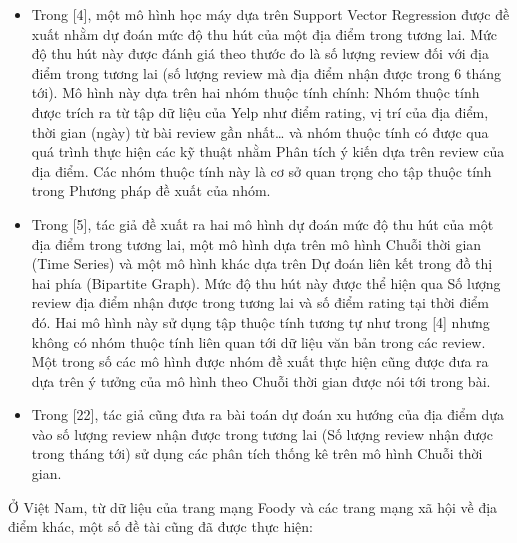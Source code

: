 \documentclass[12pt]{extarticle}
\begin{document}
\begin{itemize}
				\item Trong [4], một mô hình học máy dựa trên Support Vector Regression được đề xuất nhằm dự đoán mức độ thu hút của một địa điểm trong tương lai. Mức độ thu hút này được đánh giá theo thước đo là số lượng review đối với địa điểm trong tương lai (số lượng review mà địa điểm nhận được trong 6 tháng tới). Mô hình này dựa trên hai nhóm thuộc tính chính: Nhóm thuộc tính được trích ra từ tập dữ liệu của Yelp như điểm rating, vị trí của địa điểm, thời gian (ngày) từ bài review gần nhất… và nhóm thuộc tính có được qua quá trình thực hiện các kỹ thuật nhằm Phân tích ý kiến dựa trên review của địa điểm. Các nhóm thuộc tính này là cơ sở quan trọng cho tập thuộc tính trong Phương pháp đề xuất của nhóm.
				\item Trong [5], tác giả đề xuất ra hai mô hình dự đoán mức độ thu hút của một địa điểm trong tương lai, một mô hình dựa trên mô hình Chuỗi thời gian (Time Series) và một mô hình khác dựa trên Dự đoán liên kết trong đồ thị hai phía (Bipartite Graph). Mức độ thu hút này được thể hiện qua Số lượng review địa điểm nhận được trong tương lai và số điểm rating tại thời điểm đó. Hai mô hình này sử dụng tập thuộc tính tương tự như trong [4] nhưng không có nhóm thuộc tính liên quan tới dữ liệu văn bản trong các review. Một trong số các mô hình được nhóm đề xuất thực hiện cũng được đưa ra dựa trên ý tưởng của mô hình theo Chuỗi thời gian được nói tới trong bài. 
				\item Trong [22], tác giả cũng đưa ra bài toán dự đoán xu hướng của địa điểm dựa vào số lượng review nhận được trong tương lai (Số lượng review nhận được trong tháng tới) sử dụng các phân tích thống kê trên mô hình Chuỗi thời gian.
			\end{itemize}
			\par Ở Việt Nam, từ dữ liệu của trang mạng Foody và các trang mạng xã hội về địa điểm khác, một số đề tài cũng đã được thực hiện:
\end{document}
